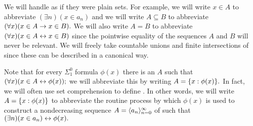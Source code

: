 \documentclass[csc]{subfiles}
\begin{document}
We will handle  as if they were plain sets.
For example, we will write \(x \in A\) to abbreviate \((\exists n)(x \in a_n)\) and we will write \(A \subseteq B\) to abbreviate \((\forall x)(x \in A \rightarrow x \in B).\) 
We will also write \(A = B\) to abbreviate \((\forall x)(x \in A \leftrightarrow x \in B)\) since the pointwise equality of the sequences \(A\) and \(B\) will never be relevant.
We will freely take countable unions and finite intersections of  since these can be described in a canonical way.

Note that for every \(\Sigma^0_1\) formula \(\phi(x)\) there is an \eset{} \(A\) such that \((\forall x)(x \in A \leftrightarrow \phi(x));\) we will abbreviate this by writing \(A = \lbrace x : \phi(x)\rbrace.\)
In fact, we will often use set comprehension to define .
In other words, we will write \(A = \lbrace x : \phi(x)\rbrace\) to abbreviate the routine process by which \(\phi(x)\) is used to construct a nondecreasing sequence \(A = \langle a_n\rangle_{n=0}^\infty\) of  such that \((\exists n)(x \in a_n) \leftrightarrow \phi(x).\)
\end{document}
